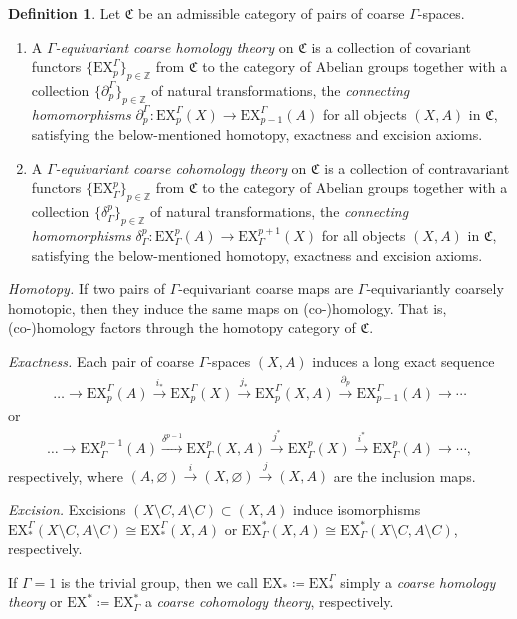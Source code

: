 \documentclass[pdftex]{sigma}
\numberwithin{equation}{section}
\theoremstyle{definition}
\newtheorem{defn}[thm]{Definition}
\newcommand{\Z}{\mathbb{Z}}
\newcommand{\HomolX}{\mathrm{EX}}
\newcommand{\CohomX}{\mathrm{EX}}
\newcommand{\admissible}{{\mathfrak{C}}}
\begin{document}
\begin{defn}\label{def:CoHomologytheories}
Let $\admissible$ be an admissible category of pairs of coarse $\Gamma$-spaces.
\begin{enumerate}\itemsep=0pt
\item[$\bullet$] A \emph{$\Gamma$-equivariant coarse homology theory} on $\admissible$ is a collection of covariant functors $\big\{\HomolX^\Gamma_p\big\}_{p\in\Z}$ from $\admissible$ to the category of Abelian groups together with a collection $\big\{\partial^\Gamma_p\big\}_{p\in\Z}$ of natural transformations, the \emph{connecting homomorphisms} $\partial^\Gamma_p\colon \HomolX^\Gamma_p(X)\to \HomolX^\Gamma_{p-1}(A)$ for all objects $(X,A)$ in $\admissible$,
 satisfying the below-mentioned homotopy, exactness and excision axioms.

\item[$\bullet$] A \emph{$\Gamma$-equivariant coarse cohomology theory} on $\admissible$ is a collection of contravariant functors $\big\{\CohomX_\Gamma^p\big\}_{p\in\Z}$ from $\admissible$ to the category of Abelian groups together with a collection $\big\{\delta_\Gamma^p\big\}_{p\in\Z}$ of natural transformations, the \emph{connecting homomorphisms} $\delta_\Gamma^p\colon \CohomX_\Gamma^p(A)\to \CohomX_\Gamma^{p+1}(X)$ for all objects $(X,A)$ in $\admissible$, satisfying the below-mentioned homotopy, exactness and excision axioms.
\end{enumerate}

\noindent
{\it Homotopy.} If two pairs of $\Gamma$-equivariant coarse maps are $\Gamma$-equivariantly coarsely homotopic, then they induce the same maps on \mbox{(co-)}homology. That is, \mbox{(co-)}homology factors through the homotopy category of $\admissible$.

\medskip\noindent
{\it Exactness.} Each pair of coarse $\Gamma$-spaces $(X,A)$ induces a long exact sequence
\begin{gather*}
\dots\to \HomolX^\Gamma_p(A)\xrightarrow{i_*}\HomolX^\Gamma_p(X)\xrightarrow{j_*}\HomolX^\Gamma_p(X,A) \xrightarrow{\partial_p}\HomolX^\Gamma_{p-1}(A)\to \cdots
\end{gather*}
or
\begin{gather*}
\dots\to \CohomX_\Gamma^{p-1}(A)\xrightarrow{\delta^{p-1}}\CohomX_\Gamma^p(X,A)\xrightarrow{j^*}\CohomX_\Gamma^p(X) \xrightarrow{i^*}\CohomX_\Gamma^{p}(A)\to \cdots,
\end{gather*}
respectively,
where $(A,\varnothing)\xrightarrow{i}(X,\varnothing)\xrightarrow{j}(X,A)$ are the inclusion maps.

\medskip\noindent
{\it Excision.} Excisions $(X\setminus C,A\setminus C)\subset (X,A)$ induce isomorphisms
\(\HomolX^\Gamma_*(X\setminus C,A\setminus C)\cong\HomolX^\Gamma_*(X,A)\) or \(\CohomX_\Gamma^*(X,A)\cong\CohomX_\Gamma^*(X\setminus C,A\setminus C)\), respectively.

If $\Gamma=1$ is the trivial group, then we call $\HomolX_*\coloneqq\HomolX^\Gamma_*$ simply a \emph{coarse homology theory} or $\CohomX^*\coloneqq\CohomX_\Gamma^*$ a \emph{coarse cohomology theory}, respectively.
\end{defn}
\end{document}
